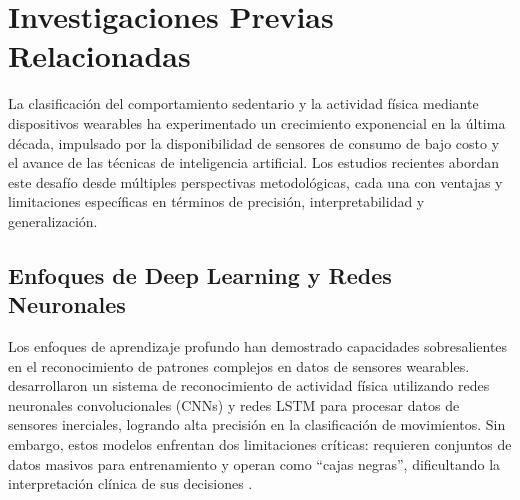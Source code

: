 
\section{Investigaciones Previas Relacionadas}
\label{sec:investigaciones_previas}


La clasificación del comportamiento sedentario y la actividad física mediante dispositivos wearables ha experimentado un crecimiento exponencial en la última década, impulsado por la disponibilidad de sensores de consumo de bajo costo y el avance de las técnicas de inteligencia artificial. Los estudios recientes abordan este desafío desde múltiples perspectivas metodológicas, cada una con ventajas y limitaciones específicas en términos de precisión, interpretabilidad y generalización.


\subsection{Enfoques de Deep Learning y Redes Neuronales}
\label{subsec:deep_learning}

Los enfoques de aprendizaje profundo han demostrado capacidades sobresalientes en el reconocimiento de patrones complejos en datos de sensores wearables. \cite{Khan2024Wearable} desarrollaron un sistema de reconocimiento de actividad física utilizando redes neuronales convolucionales (CNNs) y redes LSTM para procesar datos de sensores inerciales, logrando alta precisión en la clasificación de movimientos. Sin embargo, estos modelos enfrentan dos limitaciones críticas: requieren conjuntos de datos masivos para entrenamiento y operan como ``cajas negras'', dificultando la interpretación clínica de sus decisiones \cite{Bienefeld2023XAI}.

